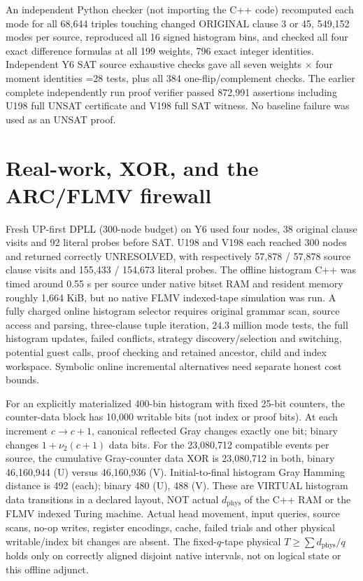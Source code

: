 \documentclass[10pt]{article}
\begin{document}
An independent Python checker (not importing the C++ code) recomputed each mode for all 68,644 triples touching changed ORIGINAL clause 3 or 45, 549,152 modes per source, reproduced all 16 signed histogram bins, and checked all four exact difference formulas at all 199 weights, 796 exact integer identities. Independent Y6 SAT source exhaustive checks gave all seven weights $\times$ four moment identities =28 tests, plus all 384 one-flip/complement checks. The earlier complete independently run proof verifier passed 872,991 assertions including U198 full UNSAT certificate and V198 full SAT witness. No baseline failure was used as an UNSAT proof.

\section{Real-work, XOR, and the ARC/FLMV firewall}
Fresh UP-first DPLL (300-node budget) on Y6 used four nodes, 38 original clause visits and 92 literal probes before SAT. U198 and V198 each reached 300 nodes and returned correctly UNRESOLVED, with respectively 57,878 / 57,878 source clause visits and 155,433 / 154,673 literal probes. The offline histogram C++ was timed around 0.55 s per source under native bitset RAM and resident memory roughly 1,664 KiB, but no native FLMV indexed-tape simulation was run. A fully charged online histogram selector requires original grammar scan, source access and parsing, three-clause tuple iteration, $24.3$ million mode tests, the full histogram updates, failed conflicts, strategy discovery/selection and switching, potential guest calls, proof checking and retained ancestor, child and index workspace. Symbolic online incremental alternatives need separate honest cost bounds.

For an explicitly materialized 400-bin histogram with fixed 25-bit counters, the counter-data block has 10,000 writable bits (not index or proof bits). At each increment $c\to c+1$, canonical reflected Gray changes exactly one bit; binary changes $1+\nu_2(c+1)$ data bits. For the 23,080,712 compatible events per source, the cumulative Gray-counter data XOR is 23,080,712 in both, binary 46,160,944 (U) versus 46,160,936 (V). Initial-to-final histogram Gray Hamming distance is 492 (each); binary 480 (U), 488 (V). These are VIRTUAL histogram data transitions in a declared layout, NOT actual $d_{\mathrm{phys}}$ of the C++ RAM or the FLMV indexed Turing machine. Actual head movement, input queries, source scans, no-op writes, register encodings, cache, failed trials and other physical writable/index bit changes are absent. The fixed-$q$-tape physical $T\ge\sum d_{\mathrm{phys}}/q$ holds only on correctly aligned disjoint native intervals, not on logical state or this offline adjunct.
\end{document}
